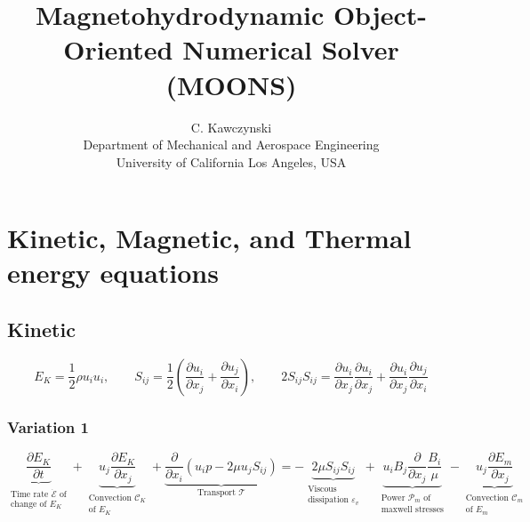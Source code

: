 \documentclass[11pt]{article}
\newcommand{\MC}{\mathcal}
\newcommand{\PD}{\partial}
\begin{document}
\doublespacing
\title{Magnetohydrodynamic Object-Oriented Numerical Solver (MOONS)}
\author{C. Kawczynski \\
Department of Mechanical and Aerospace Engineering \\
University of California Los Angeles, USA\\
}
\maketitle

\section{Kinetic, Magnetic, and Thermal energy equations}

\subsection{Kinetic}
\begin{equation}
	E_K = \frac{1}{2} \rho u_i u_i
	,\qquad
	S_{ij} = \frac{1}{2} \left( \frac{\PD u_i}{\PD x_j} + \frac{\PD u_j}{\PD x_i} \right)
	,\qquad
	2S_{ij}S_{ij} = \frac{\PD u_i}{\PD x_j} \frac{\PD u_i}{\PD x_j}
	+ \frac{\PD u_i}{\PD x_j} \frac{\PD u_j}{\PD x_i}
\end{equation}
\subsubsection{Variation 1}
\begin{equation}
	\boxed{
	\underbrace{\frac{\PD E_K}{\PD t}}_{\substack{\text{Time rate $\dot{\MC E}$ of} \\ \text{change of $E_K$}}} + 
	\underbrace{u_j \frac{\PD E_K}{\PD x_j}}_
	{\substack{\text{Convection } \MC C_K \\\text{of $E_K$}}}
	+
	\underbrace{\frac{\PD}{\PD x_i} \left( u_i p - 2 \mu u_j S_{ij} \right)}_{\text{Transport } \MC T} = 
	- \underbrace{2 \mu S_{ij} S_{ij}}_{\substack{\text{Viscous } \\ \text{dissipation } \varepsilon_v}}
	+ \underbrace{u_i B_j \frac{\PD}{\PD x_j} \frac{B_i}{\mu}}_
	{\substack{\text{Power $\MC P_{m}$ of}\\\text{maxwell stresses}}}
	- \underbrace{u_j \frac{\PD E_m}{\PD x_j}}_
	{\substack{\text{Convection $\MC C_m$}\\\text{of $E_m$}}}
	}
\end{equation}
\end{document}
